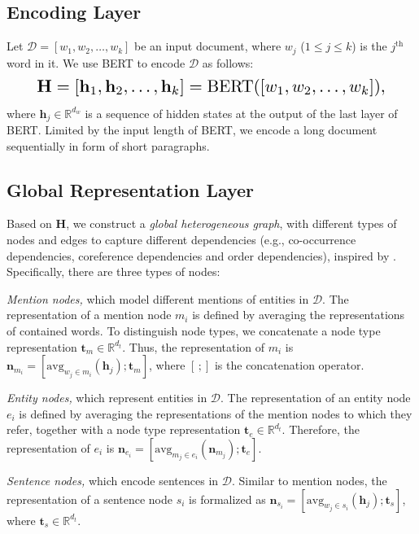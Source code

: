 \documentclass[11pt,a4paper]{article}
\begin{document}
\subsection{Encoding Layer}

Let $\mathcal{D}=[w_1,w_2,\ldots,w_k]$ be an input document, where $w_j$ ($1\leq j\leq k$) is the $j^\textrm{th}$ word in it. We use BERT to encode $\mathcal{D}$ as follows:
\begin{align}
\resizebox{.89\columnwidth}{!}{$\begin{aligned}
\mathbf{H} = [\mathbf{h}_1,\mathbf{h}_2,\ldots,\mathbf{h}_k] = \textrm{BERT}([w_1,w_2,\ldots,w_k]),
\end{aligned}$}
\end{align}
where $\mathbf{h}_j\in\mathbb{R}^{d_w}$ is a sequence of hidden states at the output of the last layer of BERT. Limited by the input length of  BERT, we encode a long document sequentially in form of short paragraphs.

\subsection{Global Representation Layer}

Based on $\mathbf{H}$, we construct a \emph{global heterogeneous graph}, with different types of nodes and edges to capture different dependencies (e.g., co-occurrence dependencies, coreference dependencies and order dependencies), inspired by \citet{christopoulou2019connecting}. 
Specifically, there are three types of nodes:
\begin{compactitem}
\item \emph{Mention nodes,} which model different mentions of entities in $\mathcal{D}$. The representation of a mention node $m_i$ is defined by averaging the representations of contained words. To distinguish node types, we concatenate a node type representation $\mathbf{t}_m\in\mathbb{R}^{d_t}$. Thus, the representation of $m_i$ is $\mathbf{n}_{m_i} = [\mathrm{avg}_{w_j\in m_i} (\mathbf{h}_j); \mathbf{t}_m]$, where $[\,;]$ is the concatenation operator.

\item \emph{Entity nodes,} which represent entities in $\mathcal{D}$. The representation of an entity node $e_i$ is defined by averaging the representations of the mention nodes to which they refer, together with a node type representation $\mathbf{t}_e\in\mathbb{R}^{d_t}$. Therefore, the representation of $e_i$ is $\mathbf{n}_{e_i} = [\mathrm{avg}_{m_j\in e_i} (\mathbf{n}_{m_j}); \mathbf{t}_e]$.

\item \emph{Sentence nodes,} which encode sentences in $\mathcal{D}$. Similar to mention nodes, the representation of a sentence node $s_i$ is formalized as $\mathbf{n}_{s_i} = [\mathrm{avg}_{w_j\in s_i} (\mathbf{h}_j); \mathbf{t}_s]$, where $\mathbf{t}_s\in\mathbb{R}^{d_t}$.
\end{compactitem}
\end{document}
